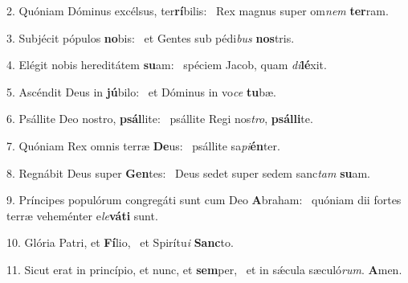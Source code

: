 2. Quóniam Dóminus excélsus, ter\textbf{rí}bilis: \ast\  Rex magnus super om\textit{nem} \textbf{ter}ram.\

3. Subjécit pópulos \textbf{no}bis: \ast\  et Gentes sub pédi\textit{bus} \textbf{nos}tris.\

4. Elégit nobis hereditátem \textbf{su}am: \ast\  spéciem Jacob, quam \textit{di}\textbf{lé}xit.\

5. Ascéndit Deus in \textbf{jú}bilo: \ast\  et Dóminus in vo\textit{ce} \textbf{tu}bæ.\

6. Psállite Deo nostro, \textbf{psál}lite: \ast\  psállite Regi nos\textit{tro}, \textbf{psál}\textbf{li}te.\

7. Quóniam Rex omnis terræ \textbf{De}us: \ast\  psállite sa\textit{pi}\textbf{én}ter.\

8. Regnábit Deus super \textbf{Gen}tes: \ast\  Deus sedet super sedem sanc\textit{tam} \textbf{su}am.\

9. Príncipes populórum congregáti sunt cum Deo \textbf{A}braham: \ast\  quóniam dii fortes terræ veheménter e\textit{le}\textbf{vá}\textbf{ti} sunt.\

10. Glória Patri, et \textbf{Fí}lio, \ast\  et Spirítu\textit{i} \textbf{Sanc}to.\

11. Sicut erat in princípio, et nunc, et \textbf{sem}per, \ast\  et in sǽcula sæculó\textit{rum}. \textbf{A}men.\

